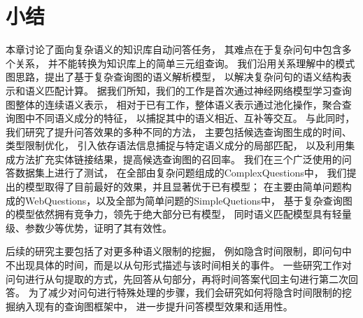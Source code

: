 






\section{小结}%

本章讨论了面向复杂语义的知识库自动问答任务，
其难点在于复杂问句中包含多个关系，
并不能转换为知识库上的简单三元组查询。
我们沿用关系理解中的模式图思路，提出了基于复杂查询图的语义解析模型，
以解决复杂问句的语义结构表示和语义匹配计算。
据我们所知，我们的工作是首次通过神经网络模型学习查询图整体的连续语义表示，
相对于已有工作，整体语义表示通过池化操作，聚合查询图中不同语义成分的特征，
以捕捉其中的语义相近、互补等交互。
与此同时，我们研究了提升问答效果的多种不同的方法，
主要包括候选查询图生成的时间、类型限制优化，
引入依存语法信息捕捉与特定语义成分的局部匹配，
以及利用集成方法扩充实体链接结果，提高候选查询图的召回率。
我们在三个广泛使用的问答数据集上进行了测试，
在全部由复杂问题组成的ComplexQuestions中，
我们提出的模型取得了目前最好的效果，并且显著优于已有模型；
在主要由简单问题构成的WebQuestions，以及全部为简单问题的SimpleQuetions中，
基于复杂查询图的模型依然拥有竞争力，领先于绝大部分已有模型，
同时语义匹配模型具有轻量级、参数少等优势，证明了其有效性。

后续的研究主要包括了对更多种语义限制的挖掘，
例如隐含时间限制，即问句中不出现具体的时间，而是以从句形式描述与该时间相关的事件。
一些研究工作对问句进行从句提取的方式，先回答从句部分，再将时间答案代回主句进行第二次回答。
为了减少对问句进行特殊处理的步骤，我们会研究如何将隐含时间限制的挖掘纳入现有的查询图框架中，
进一步提升问答模型效果和适用性。

